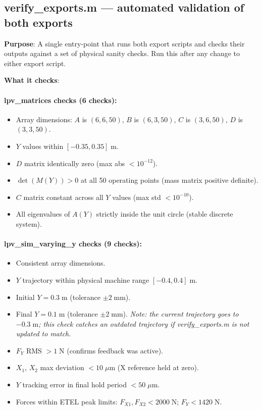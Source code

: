 \documentclass[11pt,a4paper]{article}
\begin{document}
\subsection{verify\_exports.m --- automated validation of both exports}
\label{sec:verify_exports}

\textbf{Purpose}: A single entry-point that runs both export scripts and checks their outputs
against a set of physical sanity checks. Run this after any change to either export script.

\textbf{What it checks}:

\paragraph{lpv\_matrices checks (6 checks):}
\begin{itemize}[nosep]
\item Array dimensions: $A$ is $(6,6,50)$, $B$ is $(6,3,50)$, $C$ is $(3,6,50)$, $D$ is $(3,3,50)$.
\item $Y$ values within $[-0.35, 0.35]\;\text{m}$.
\item $D$ matrix identically zero (max abs $< 10^{-12}$).
\item $\det(M(Y)) > 0$ at all 50 operating points (mass matrix positive definite).
\item $C$ matrix constant across all $Y$ values (max std $< 10^{-10}$).
\item All eigenvalues of $A(Y)$ strictly inside the unit circle (stable discrete system).
\end{itemize}

\paragraph{lpv\_sim\_varying\_y checks (9 checks):}
\begin{itemize}[nosep]
\item Consistent array dimensions.
\item $Y$ trajectory within physical machine range $[-0.4, 0.4]\;\text{m}$.
\item Initial $Y = 0.3\;\text{m}$ (tolerance $\pm 2\;\text{mm}$).
\item Final $Y = 0.1\;\text{m}$ (tolerance $\pm 2\;\text{mm}$).
  \emph{Note: the current trajectory goes to $-0.3\;\text{m}$; this check catches an
  outdated trajectory if verify\_exports.m is not updated to match.}
\item $F_Y$ RMS $> 1\;\text{N}$ (confirms feedback was active).
\item $X_1$, $X_2$ max deviation $< 10\;\mu\text{m}$ (X reference held at zero).
\item $Y$ tracking error in final hold period $< 50\;\mu\text{m}$.
\item Forces within ETEL peak limits: $F_{X1}, F_{X2} < 2000\;\text{N}$;
  $F_Y < 1420\;\text{N}$.
\end{itemize}
\end{document}
